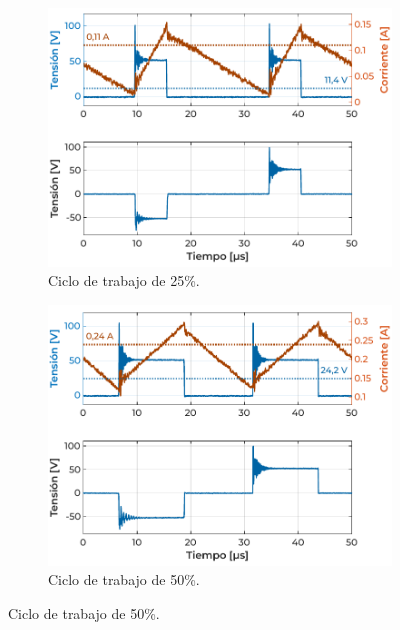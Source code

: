 \begin{figure}[h]
    \centering
    \begin{subfigure}{0.48\textwidth}
        \centering
        \includegraphics[width=\textwidth]{Imagenes/Con Carga - Caso 3.pdf}
        \caption{Ciclo de trabajo de 25\%.}
        \label{fig:ensayo_concarga15V_DC25}
    \end{subfigure}
    \hspace{0.5em}
    \begin{subfigure}{0.48\textwidth}
        \centering
        \includegraphics[width=\textwidth]{Imagenes/Con Carga - Caso 1.pdf}
        \caption{Ciclo de trabajo de 50\%.}

\end{subfigure}
\end{figure}
